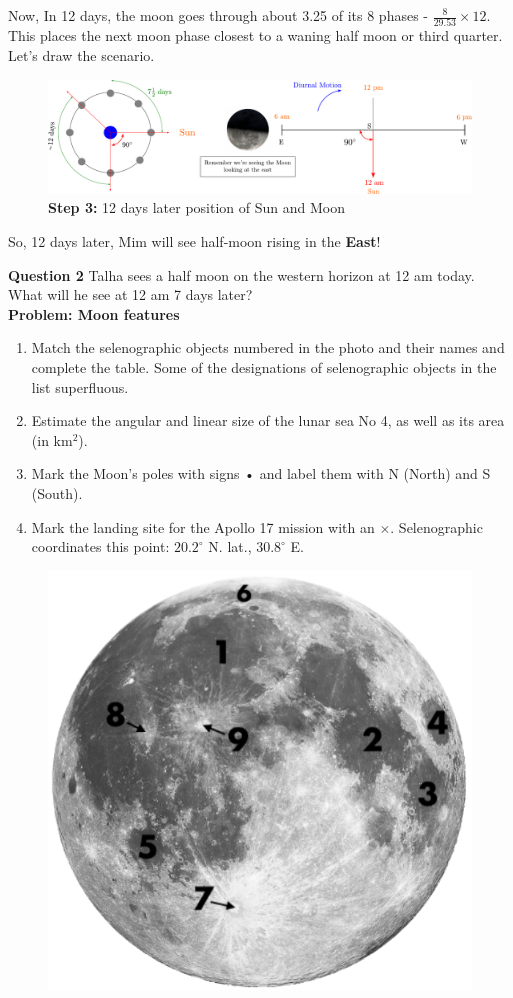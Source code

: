 \documentclass[a4paper,12pt]{extarticle}
\begin{document}
\begin{sol}
Now, In 12 days, the moon goes through about 3.25 of its 8 phases - $\frac{8}{29.53} \times 12$. This places the next moon phase closest to a waning half moon or third quarter. Let's draw the scenario.
	\begin{figure}[H]
	\centering
	\includegraphics[width=0.9\linewidth]{moon_position3.pdf}
	\caption*{\textbf{Step 3:} 12 days later position of Sun and Moon}
\end{figure}
So, 12 days later, Mim will see half-moon rising in the \textbf{East}!
\end{sol}
\vspace{1cm}
\textsf{\textbf{Question 2}} Talha sees a half moon on the western horizon at 12 am today. What will he see at 12 am 7 days later?\\

\clearpage
\textsf{\textbf{\large Problem: Moon features}}
\begin{enumerate}
	\item Match the selenographic objects numbered in the photo and their names and complete the table. Some of the designations of selenographic objects in the list superfluous.
	\item Estimate the angular and linear size of the lunar sea No 4, as well as its area (in km$^2$).
	\item Mark the Moon's poles with signs • and label them with N (North) and S (South).
	\item Mark the landing site for the Apollo 17 mission with an $\times$. Selenographic coordinates this point: $20.2^\circ$ N. lat., $30.8^\circ$ E.
\end{enumerate}
\begin{figure}[H]
	\centering
	\includegraphics[width=0.6\linewidth]{moon2.png}
\end{figure}
\end{document}
